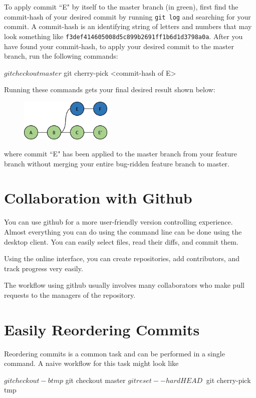 \documentclass[12pt]{report}
\newcommand\code[1]{{\color{blue}\texttt{#1}}}
\begin{document}
To apply commit ``E" by itself to the master branch (in green), first find the commit-hash of your desired commit by running \code{git log} and searching for your commit.  A commit-hash is an identifying string of letters and numbers that may look something like \texttt{f3def414605008d5c899b2691ff1b6d1d3798a0a}.  After you have found your commit-hash, to apply your desired commit to the master branch, run the following commands:
\begin{blockcode}
$ git checkout master
$ git cherry-pick <commit-hash of E>
\end{blockcode}

Running these commands gets your final desired result shown below:

\begin{figure}[h]
\center
\includegraphics[height=2cm]{cherrypick}
\end{figure}

where commit ``E" has been applied to the master branch from your feature branch without merging your entire bug-ridden feature branch to master.

\section{Collaboration with Github}

You can use github for a more user-friendly version controlling experience.  Almost everything you can do using the command line can be done using the desktop client.  You can easily select files, read their diffs, and commit them.
 

Using the online interface, you can create repositories, add contributors, and track progress very easily.

The workflow using github usually involves many collaborators who make pull requests to the managers of the repository.


\section{Easily Reordering Commits}

Reordering commits is a common task and can be performed in a single command. 
A naive workflow for this task might look like
\begin{badblockcode}
$ git checkout -b tmp
$ git checkout master
$ git reset --hard HEAD~
$ git cherry-pick tmp
\end{badblockcode}
\end{document}
